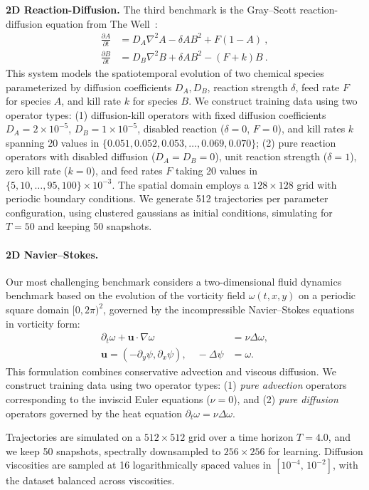 \documentclass{article}
\theoremstyle{plain}
\theoremstyle{definition}
\theoremstyle{remark}
\begin{document}
\textbf{2D Reaction-Diffusion.} The third benchmark is the Gray--Scott reaction-diffusion equation from The Well~\citep{ohana2024well}: 
\begin{align*} 
\frac{\partial A}{\partial t} &= D_A \nabla^2 A - \delta AB^2 + F(1-A)~, \\
\frac{\partial B}{\partial t} &= D_B \nabla^2 B + \delta AB^2 - (F+k)B ~.
\end{align*} 
This system models the spatiotemporal evolution of two chemical species parameterized by diffusion coefficients $D_A, D_B$, reaction strength $\delta$, feed rate $F$ for species $A$, and kill rate $k$ for species $B$. We construct training data using two operator types: (1) diffusion-kill operators with fixed diffusion coefficients $D_A=2 \times 10^{-5}$, $D_B=1 \times 10^{-5}$, disabled reaction ($\delta = 0$, $F=0$), and kill rates $k$ spanning 20 values 
in $\{0.051, 0.052, 0.053, \ldots, 0.069, 0.070\}$; (2) pure reaction operators with disabled diffusion ($D_A=D_B=0$), unit reaction strength ($\delta = 1$), zero kill rate ($k=0$), and feed rates $F$ taking 20 values in 
$\{5, 10, \ldots, 95, 100\} \times 10^{-3}$. 
The spatial domain employs a $128 \times 128$ grid with periodic boundary conditions. We generate 512 trajectories per parameter configuration, using clustered gaussians as initial conditions, simulating for $T=50$ and keeping 50 snapshots. 

\paragraph{2D Navier--Stokes.}
Our most challenging benchmark considers a two-dimensional fluid dynamics benchmark based on the evolution of the vorticity field \(\omega(t,x,y)\) on a periodic square domain \([0,2\pi)^2\), governed by the incompressible Navier--Stokes equations in
vorticity form:
\begin{align*}
\partial_t \omega + \mathbf{u}\cdot\nabla \omega &= \nu \Delta \omega, \\
\mathbf{u} = (-\partial_y \psi,\partial_x \psi), 
\quad -\Delta \psi &= \omega .
\end{align*}
This formulation combines conservative advection and viscous diffusion.
We construct training data using two operator types: (1) \emph{pure advection} operators corresponding to the inviscid Euler equations (\(\nu=0\)), and (2) \emph{pure diffusion} operators governed by the heat equation
\(\partial_t \omega = \nu \Delta \omega\). 

Trajectories are simulated on a \(512\times512\) grid over a time horizon
\(T=4.0\), and we keep 50 snapshots, spectrally downsampled to \(256\times256\) for learning. Diffusion viscosities are sampled at 16 logarithmically spaced values in
\([10^{-4},\,10^{-2}]\), with the dataset balanced across viscosities.
\end{document}
